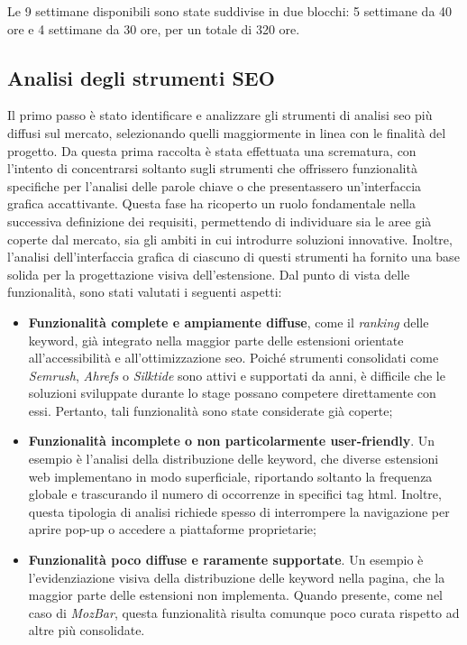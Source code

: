 \vspace{5pt}
\noindent Le 9 settimane disponibili sono state suddivise in due blocchi: 5 settimane da 40 ore e 4 settimane da 30 ore, per un totale di 320 ore.

\subsection{Analisi degli strumenti SEO}

Il primo passo è stato identificare e analizzare gli strumenti di analisi \gls{seo} più diffusi sul mercato, selezionando quelli maggiormente in linea con le finalità del progetto. Da questa prima raccolta è stata effettuata una scrematura, con l’intento di concentrarsi soltanto sugli strumenti che offrissero funzionalità specifiche per l’analisi delle parole chiave o che presentassero un’interfaccia grafica accattivante. Questa fase ha ricoperto un ruolo fondamentale nella successiva definizione dei \gls{requisiti}, permettendo di individuare sia le aree già coperte dal mercato, sia gli ambiti in cui introdurre soluzioni innovative. Inoltre, l’analisi dell’interfaccia grafica di ciascuno di questi strumenti ha fornito una base solida per la progettazione visiva dell’estensione. Dal punto di vista delle funzionalità, sono stati valutati i seguenti aspetti:
\begin{itemize}
  \item \textbf{Funzionalità complete e ampiamente diffuse}, come il \textit{ranking} delle keyword, già integrato nella maggior parte delle estensioni orientate all’accessibilità e all’ottimizzazione \gls{seo}. Poiché strumenti consolidati come \textit{Semrush}, \textit{Ahrefs} o \textit{Silktide} sono attivi e supportati da anni, è difficile che le soluzioni sviluppate durante lo stage possano competere direttamente con essi. Pertanto, tali funzionalità sono state considerate già coperte;
  \item \textbf{Funzionalità incomplete o non particolarmente user-friendly}. Un esempio è l’analisi della distribuzione delle keyword, che diverse estensioni web implementano in modo superficiale, riportando soltanto la frequenza globale e trascurando il numero di occorrenze in specifici tag \gls{html}. Inoltre, questa tipologia di analisi richiede spesso di interrompere la navigazione per aprire pop-up o accedere a piattaforme proprietarie;
  \item \textbf{Funzionalità poco diffuse e raramente supportate}. Un esempio è l’evidenziazione visiva della distribuzione delle keyword nella pagina, che la maggior parte delle estensioni non implementa. Quando presente, come nel caso di \textit{MozBar}, questa funzionalità risulta comunque poco curata rispetto ad altre più consolidate.
\end{itemize}

